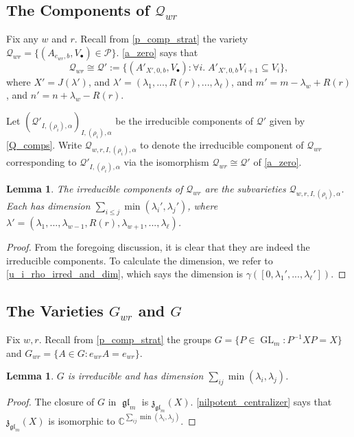 \documentclass[12pt,psamsfonts]{article}
\DeclareMathOperator{\GL}{GL}
\DeclareMathOperator{\gl}{\mathfrak{gl}}
\newtheorem{lemma}[theorem]{Lemma}
\begin{document}
\subsection{The Components of \texorpdfstring{\(\mathcal{Q}_{wr}\)}{Q\_\{wr\}}}
Fix any \(w\) and \(r\).
Recall from \cref{p_comp_strat} the variety \(\mathcal{Q}_{wr} = \{(A_{e_{wr}, b}, V_\bullet) \in \mathcal{P}\}\).
\cref{a_zero} says that 
\[\mathcal{Q}_{wr} \cong \mathcal{Q}' := \{(A'_{X', 0, b}, V_\bullet) : \forall i. \; A'_{X', 0, b} V_{i + 1} \subseteq V_i\},\]
where \(X' = J(\lambda')\), and \(\lambda' = (\lambda_1, ..., R(r), ..., \lambda_\ell)\), and \(m' = m - \lambda_w + R(r)\), and \(n' = n + \lambda_w - R(r)\).
\par Let \((\mathcal{Q}'_{I, (\rho_i), \alpha})_{I, (\rho_i), \alpha}\) be the irreducible components of \(\mathcal{Q}'\) given by \cref{Q_comps}.
Write \(\mathcal{Q}_{w,r,I,(\rho_i),\alpha}\) to denote the irreducible component of \(\mathcal{Q}_{wr}\) corresponding to \(\mathcal{Q}'_{I, (\rho_i), \alpha}\) via the isomorphism \(\mathcal{Q}_{wr} \cong \mathcal{Q}'\) of \cref{a_zero}.

\begin{lemma}\label{qwr_comps}
    The irreducible components of \(\mathcal{Q}_{wr}\) are the subvarieties \(\mathcal{Q}_{w,r,I,(\rho_i),\alpha}\).
    Each has dimension \(\sum_{i \leq j} \min(\lambda_i', \lambda_j')\), where \(\lambda' = (\lambda_1, ..., \lambda_{w - 1}, R(r), \lambda_{w + 1}, ..., \lambda_\ell)\).
\end{lemma}
\begin{proof}
    From the foregoing discussion, it is clear that they are indeed the irreducible components.
    To calculate the dimension, we refer to \cref{u_i_rho_irred_and_dim}, which says the dimension is \(\gamma([0, \lambda_1', ..., \lambda_\ell'])\).
\end{proof}

\subsection{The Varieties \texorpdfstring{\(G_{wr}\)}{G\_\{wr\}} and \texorpdfstring{\(G\)}{G}}
Fix \(w,r\).
Recall from \cref{p_comp_strat} the groups \(G = \{P \in \GL_m : P^{-1}XP = X\}\) and \(G_{wr} = \{A \in G : e_{wr} A = e_{wr}\}\).
\begin{lemma}\label{g_irred_dim}
    \(G\) is irreducible and has dimension \(\sum_{ij} \min(\lambda_i, \lambda_j)\).
\end{lemma}
\begin{proof}
    The closure of \(G\) in \(\gl_m\) is \(\mathfrak{z}_{\gl_m}(X)\).
    \cref{nilpotent_centralizer} says that \(\mathfrak{z}_{\gl_m}(X)\) is isomorphic to \(\mathbb{C}^{\sum_{ij} \min(\lambda_i, \lambda_j)}\).
\end{proof}
\end{document}
